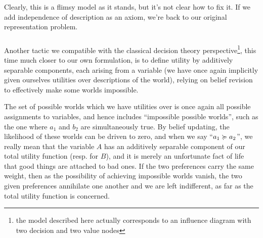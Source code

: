 \documentclass{article}
\begin{document}
	Clearly, this is a flimsy model as it stands, but it's not clear how to fix it. If we add independence of description as an axiom, we're back to our original representation problem. 
	
	\subsubsection{}
	Another tactic we compatible with the classical decision theory perspective\footnote{the model described here actually corresponds to an influence diagram with two decision and two value nodes}, this time much closer to our own formulation, is to define utility by additively separable components, each arising from a variable (we have once again implicitly given ourselves utilities over descriptions of the world), relying on belief revision to effectively make some worlds impossible.
	
	The set of possible worlds which we have utilities over is once again all possible assignments to variables, and hence includes ``impossible possible worlds'', such as the one where $a_1$ and $b_2$ are simultaneously true. By belief updating, the likelihood of these worlds can be driven to zero, and when we say ``$a_1 \succcurlyeq a_2$'', we really mean that the variable $A$ has an additively separable component of our total utility function (resp. for $B$), and it is merely an unfortunate fact of life that good things are attached to bad ones. If the two preferences carry the same weight, then as the possibility of achieving impossible worlds vanish, the two given preferences annihilate one another and we are left indifferent, as far as the total utility function is concerned.
	
\end{document}
